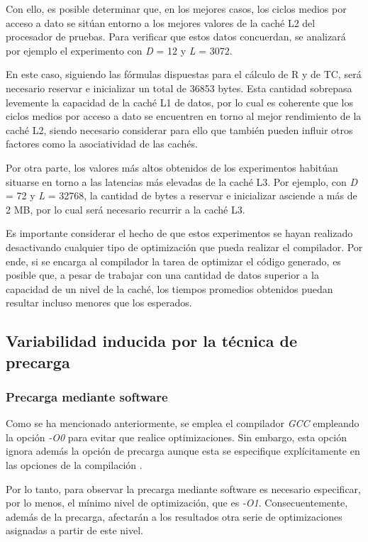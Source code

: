 \documentclass[conference]{IEEEtran}
\begin{document}
Con ello, es posible determinar que, en los mejores casos, los ciclos medios por acceso a dato se sitúan entorno a los mejores valores de la caché L2 del procesador de pruebas. Para verificar que estos datos concuerdan, se analizará por ejemplo el experimento con \textit{D} = 12 y \textit{L} = 3072.

En este caso, siguiendo las fórmulas dispuestas para el cálculo de R y de TC, será necesario reservar e inicializar un total de 36853 bytes. Esta cantidad sobrepasa levemente la capacidad de la caché L1 de datos, por lo cual es coherente que los ciclos medios por acceso a dato se encuentren en torno al mejor rendimiento de la caché L2, siendo necesario considerar para ello que también pueden influir otros factores como la asociatividad de las cachés.

Por otra parte, los valores más altos obtenidos de los experimentos habitúan situarse en torno a las latencias más elevadas de la caché L3. Por ejemplo, con \textit{D} = 72 y \textit{L} = 32768, la cantidad de bytes a reservar e inicializar asciende a más de 2 MB, por lo cual será necesario recurrir a la caché L3.

Es importante considerar el hecho de que estos experimentos se hayan realizado desactivando cualquier tipo de optimización que pueda realizar el compilador. Por ende, si se encarga al compilador la tarea de optimizar el código generado, es posible que, a pesar de trabajar con una cantidad de datos superior a la capacidad de un nivel de la caché, los tiempos promedios obtenidos puedan resultar incluso menores que los esperados.

\subsection{Variabilidad inducida por la técnica de precarga}

\subsubsection{Precarga mediante software}

Como se ha mencionado anteriormente, se emplea el compilador \textit{GCC} empleando la opción \textit{-O0} para evitar que realice optimizaciones. Sin embargo, esta opción ignora además la opción de precarga aunque esta se especifique explícitamente en las opciones de la compilación \cite{noQuiereOptimizar}.

Por lo tanto, para observar la precarga mediante software es necesario especificar, por lo menos, el mínimo nivel de optimización, que es \textit{-O1}. Consecuentemente, además de la precarga, afectarán a los resultados otra serie de optimizaciones asignadas a partir de este nivel.
\end{document}
